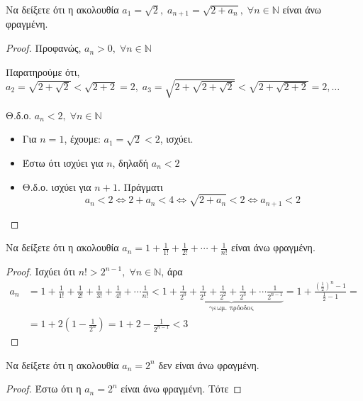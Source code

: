 \begin{enumerate}
  \item Να δείξετε ότι η ακολουθία $ a_{1} = \sqrt{2}, \; a_{n+1} =
    \sqrt{2+ a_{n}}, \; \forall n \in \mathbb{N} $ είναι άνω φραγμένη.
    \begin{proof}
    \item {}
      Προφανώς, $ a_{n} > 0, \; \forall n \in \mathbb{N} $ 

      Παρατηρούμε ότι, $ a_{2}= \sqrt{2 + \sqrt{2}} < \sqrt{2+2} =2, \; 
      a_{3}= \sqrt{2+ \sqrt{2 + \sqrt{2}}} < \sqrt{2+ \sqrt{2+2}} = 2, 
      \ldots $ 

      Θ.δ.ο. $ a_{n} < 2, \; \forall n \in \mathbb{N} $ 
      \begin{itemize}
        \item Για $ n=1 $, έχουμε: $ a_{1}= \sqrt{2} < 2 $, ισχύει.
        \item Έστω ότι ισχύει για $n$, δηλαδή $ a_{n} < 2 $
        \item Θ.δ.ο. ισχύει για $ n+1 $. Πράγματι
          \[
            a_{n}<2 \Leftrightarrow 2+a_{n} < 4 \Leftrightarrow 
            \sqrt{2+ a_{n}} < 2\Leftrightarrow a_{n+1} <2
          \] 
      \end{itemize}
    \end{proof}


  \item Να δείξετε ότι η ακολουθία $ a_{n} = 1 + \frac{1}{1!} +
    \frac{1}{2!} + \cdots + \frac{1}{n!} $ είναι άνω φραγμένη.
    \begin{proof}
    \item {} 
      Ισχύει ότι $ n! > 2^{n-1}, \; \forall n \in \mathbb{N} $, άρα 
      \begin{align*}
        a_{n} &= 1 + \frac{1}{1!} + \frac{1}{2!} + \frac{1}{3!} + 
        \frac{1}{4!} + \cdots \frac{1}{n!} < 1 + 
        \underbrace{\frac{1}{2^{0}} 
          + \frac{1}{2^{1}} + \frac{1}{2^{2}} + \frac{1}{2^{3}} 
        + \cdots \frac{1}{2^{n-1}}}_ {\text{γεωμ. πρόοδος}} = 
        1 + \frac{\left(\frac{1}{2}\right)^{n}-1}{\frac{1}{2} -1} =\\ 
              &= 1 + 2\left(1- \frac{1}{2^{n}}\right) = 1+2- 
              \frac{1}{2^{n-1}} < 3 
      \end{align*} 
    \end{proof}

  \item Να δείξετε ότι η ακολουθία $ a_{n} = 2^{n} $ δεν είναι άνω 
    φραγμένη.
    \begin{proof}
    \item {} 
      Έστω ότι η $ a_{n}=2^{n} $ είναι άνω φραγμένη. Τότε 


\end{proof}
\end{enumerate}
